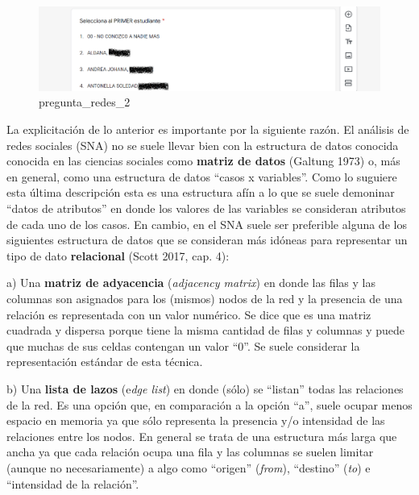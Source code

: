 \documentclass[
  letterpaper,
  DIV=11,
  numbers=noendperiod]{scrreprt}
\begin{document}
\begin{figure}

{\centering \includegraphics[width=6.25in,height=\textheight]{./Inputs/Images/pregunta_redes_2.png}

}

\caption{pregunta\_redes\_2}

\end{figure}

La explicitación de lo anterior es importante por la siguiente razón. El
análisis de redes sociales (SNA) no se suele llevar bien con la
estructura de datos conocida conocida en las ciencias sociales como
\textbf{matriz de datos} (Galtung 1973) o, más en general, como una
estructura de datos ``casos x variables''. Como lo suguiere esta última
descripción esta es una estructura afín a lo que se suele demoninar
``datos de atributos'' en donde los valores de las variables se
consideran atributos de cada uno de los casos. En cambio, en el SNA
suele ser preferible alguna de los siguientes estructura de datos que se
consideran más idóneas para representar un tipo de dato
\textbf{relacional} (Scott 2017, cap. 4):

a) Una \textbf{matriz de adyacencia} (\emph{adjacency matrix}) en donde
las filas y las columnas son asignados para los (mismos) nodos de la red
y la presencia de una relación es representada con un valor numérico. Se
dice que es una matriz cuadrada y dispersa porque tiene la misma
cantidad de filas y columnas y puede que muchas de sus celdas contengan
un valor ``0''. Se suele considerar la representación estándar de esta
técnica.

b) Una \textbf{lista de lazos} (e\emph{dge list}) en donde (sólo) se
``listan'' todas las relaciones de la red. Es una opción que, en
comparación a la opción ``a'', suele ocupar menos espacio en memoria ya
que sólo representa la presencia y/o intensidad de las relaciones entre
los nodos. En general se trata de una estructura más larga que ancha ya
que cada relación ocupa una fila y las columnas se suelen limitar
(aunque no necesariamente) a algo como ``origen'' (\emph{from}),
``destino'' (\emph{to}) e ``intensidad de la relación''.
\end{document}
